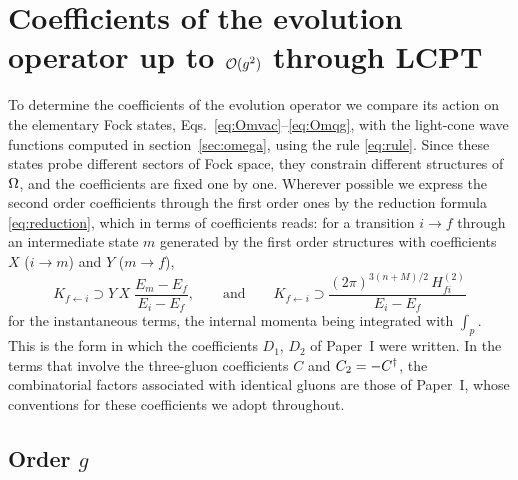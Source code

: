\section{Coefficients of the evolution operator up to $\mathcal{O}(g^{2})$ through LCPT}
\label{sec:coeff}

To determine the coefficients of the evolution operator we compare its action on the elementary
Fock states, Eqs.~\eqref{eq:Omvac}--\eqref{eq:Omqg}, with the light-cone wave functions computed in
section~\ref{sec:omega}, using the rule \eqref{eq:rule}. Since these states probe different
sectors of Fock space, they constrain different structures of $\Omega$, and the coefficients are fixed
one by one. Wherever possible we express the second order coefficients through the first order
ones by the reduction formula \eqref{eq:reduction}, which in terms of coefficients reads: for a
transition $i\to f$ through an intermediate state $m$ generated by the first order structures with
coefficients $X$ ($i\to m$) and $Y$ ($m\to f$),
\begin{equation}
K_{f\leftarrow i}\supset Y\,X\;\frac{E_{m}-E_{f}}{E_{i}-E_{f}},
\qquad\text{and}\qquad
K_{f\leftarrow i}\supset\frac{(2\pi)^{3(n+M)/2}\,H^{(2)}_{fi}}{E_{i}-E_{f}}
\label{eq:redcoef}
\end{equation}
for the instantaneous terms, the internal momenta being integrated with $\int_{p}$. This is the
form in which the coefficients $D_{1}$, $D_{2}$ of Paper~I were written. In the terms that involve the
three-gluon coefficients $C$ and $C_{2}=-C^{\dagger}$, the combinatorial factors associated with identical
gluons are those of Paper~I, whose conventions for these coefficients we adopt throughout.

\subsection{Order $g$}

